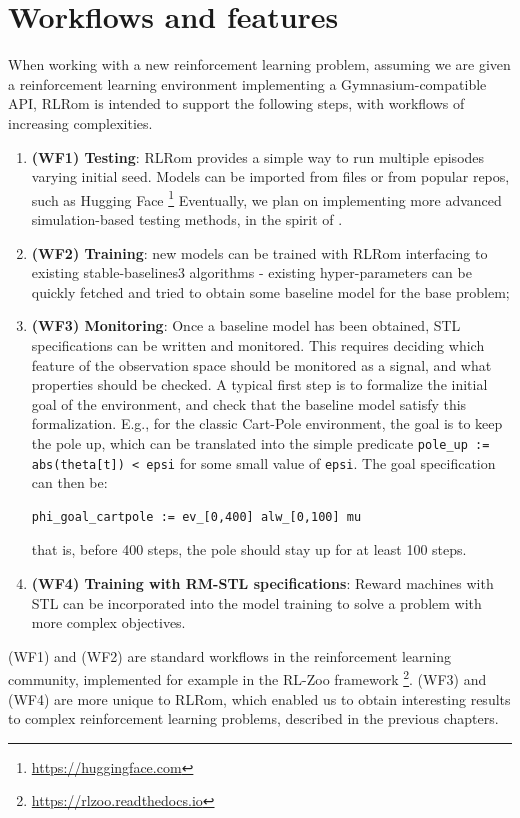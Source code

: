 \section{Workflows and features}
\label{sec:workflows}

When working with a new reinforcement learning problem, assuming we are given a reinforcement learning environment implementing a Gymnasium-compatible API, RLRom is intended to support the following steps, with workflows of increasing 
complexities.
\begin{enumerate}
\item \textbf{(WF1) Testing}: RLRom provides a simple way to run multiple episodes varying initial seed. Models can be imported from files or from popular repos, such as Hugging Face 
\footnote{\url{https://huggingface.com}} Eventually, we plan on implementing more advanced simulation-based testing methods, in the spirit of \cite{donze_breach_2010}. 
\item \textbf{(WF2) Training}: new models can be trained with RLRom interfacing to existing stable-baselines3 algorithms - existing hyper-parameters can be quickly fetched and 
tried to obtain some baseline model for the base problem;
\item \textbf{(WF3) Monitoring}: Once a baseline model has been obtained, STL specifications can be written and monitored. This requires deciding which feature of the observation space 
should be monitored as a signal, and what properties should be checked. A typical first step is to formalize the initial goal of the environment, and check that the baseline model satisfy 
this formalization. E.g., for the classic Cart-Pole environment, the goal is to keep the pole up, which can be translated into the simple predicate \texttt{pole\_up := abs(theta[t]) < epsi} 
for some small value of \texttt{epsi}. The goal specification can then be:
  \begin{center}
\begin{verbatim}
phi_goal_cartpole := ev_[0,400] alw_[0,100] mu
\end{verbatim}
  \end{center}
  that is, before 400 steps, the pole should stay up for at least 100 steps.
\item \textbf{(WF4) Training with RM-STL specifications}: Reward machines with STL can be incorporated into the model training to solve a problem with more complex objectives. 
\end{enumerate}

(WF1) and (WF2) are standard workflows in the reinforcement learning community, implemented for example in the RL-Zoo framework \footnote{\url{https://rlzoo.readthedocs.io}}. (WF3) and (WF4) 
are more unique to RLRom, which enabled us to obtain interesting results to complex reinforcement learning problems, described in the previous chapters. 

